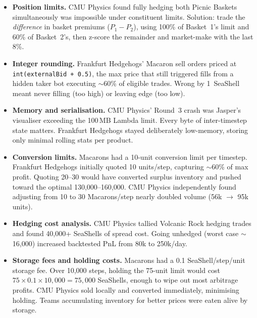 \begin{itemize}
  \item \textbf{Position limits.}  CMU Physics found fully hedging
        both Picnic Baskets simultaneously was impossible under
        constituent limits.  Solution: trade the \emph{difference}
        in basket premiums ($P_1 - P_2$), using 100\% of Basket~1's
        limit and 60\% of Basket~2's, then z-score the remainder
        and market-make with the last 8\%.

  \item \textbf{Integer rounding.}  Frankfurt Hedgehogs' Macaron
        sell orders priced at \texttt{int(externalBid + 0.5)}, the
        max price that still triggered fills from a hidden taker
        bot executing $\sim$60\% of eligible trades.  Wrong by
        1~SeaShell meant never filling (too high) or leaving edge
        (too low).

  \item \textbf{Memory and serialisation.}  CMU Physics' Round~3
        crash was Jasper's visualiser exceeding the 100\,MB Lambda
        limit.  Every byte of inter-timestep state matters.
        Frankfurt Hedgehogs stayed deliberately low-memory,
        storing only minimal rolling stats per product.

  \item \textbf{Conversion limits.}  Macarons had a 10-unit
        conversion limit per timestep.  Frankfurt Hedgehogs
        initially quoted 10 units/step, capturing $\sim$60\% of
        max profit.  Quoting 20--30 would have converted surplus
        inventory and pushed toward the optimal 130{,}000--160{,}000.
        CMU Physics independently found adjusting from 10 to 30
        Macarons/step nearly doubled volume (56k $\to$ 95k units).

  \item \textbf{Hedging cost analysis.}  CMU Physics tallied
        Volcanic Rock hedging trades and found 40{,}000+ SeaShells
        of spread cost.  Going unhedged (worst case $\sim$16{,}000)
        increased backtested PnL from 80k to 250k/day.

  \item \textbf{Storage fees and holding costs.}  Macarons had a
        0.1 SeaShell/step/unit storage fee.  Over 10{,}000 steps,
        holding the 75-unit limit would cost
        $75 \times 0.1 \times 10{,}000 = 75{,}000$ SeaShells, enough
        to wipe out most arbitrage profits.  CMU Physics sold
        locally and converted immediately, minimising holding.
        Teams accumulating inventory for better prices were eaten
        alive by storage.
\end{itemize}

